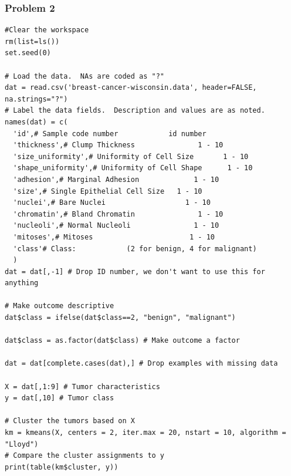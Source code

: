 \documentclass[12pt]{article}
\begin{document}
\newpage
\subsubsection*{Problem 2}
\begin{lstlisting}
#Clear the workspace
rm(list=ls())
set.seed(0)

# Load the data.  NAs are coded as "?"
dat = read.csv('breast-cancer-wisconsin.data', header=FALSE, na.strings="?")
# Label the data fields.  Description and values are as noted.
names(dat) = c(
  'id',# Sample code number            id number
  'thickness',# Clump Thickness               1 - 10
  'size_uniformity',# Uniformity of Cell Size       1 - 10
  'shape_uniformity',# Uniformity of Cell Shape      1 - 10
  'adhesion',# Marginal Adhesion             1 - 10
  'size',# Single Epithelial Cell Size   1 - 10
  'nuclei',# Bare Nuclei                   1 - 10
  'chromatin',# Bland Chromatin               1 - 10
  'nucleoli',# Normal Nucleoli               1 - 10
  'mitoses',# Mitoses                       1 - 10
  'class'# Class:            (2 for benign, 4 for malignant)
  )
dat = dat[,-1] # Drop ID number, we don't want to use this for anything

# Make outcome descriptive
dat$class = ifelse(dat$class==2, "benign", "malignant")

dat$class = as.factor(dat$class) # Make outcome a factor

dat = dat[complete.cases(dat),] # Drop examples with missing data

X = dat[,1:9] # Tumor characteristics
y = dat[,10] # Tumor class

# Cluster the tumors based on X
km = kmeans(X, centers = 2, iter.max = 20, nstart = 10, algorithm = "Lloyd")
# Compare the cluster assignments to y
print(table(km$cluster, y))
\end{lstlisting}

\newpage
\end{document}
